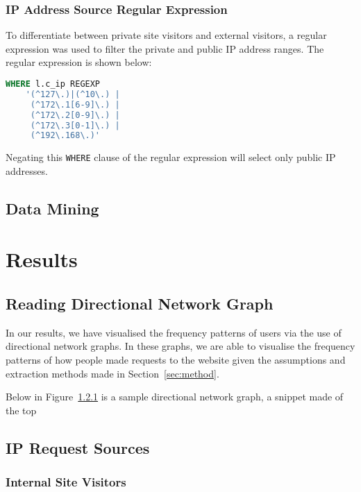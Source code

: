 \documentclass[12pt,titlepage]{article}
\begin{document}
\subsubsection{IP Address Source Regular Expression}

To differentiate between private site visitors and external visitors, a regular expression was used to filter the private and public IP address ranges. The regular expression is shown below:

\begin{lstlisting}[language=SQL, xleftmargin=2cm]
WHERE l.c_ip REGEXP 
	'(^127\.)|(^10\.) | 
	 (^172\.1[6-9]\.) |
	 (^172\.2[0-9]\.) |
	 (^172\.3[0-1]\.) |
	 (^192\.168\.)'
\end{lstlisting}

Negating this \texttt{WHERE} clause of the regular expression will select only public IP addresses.

\subsection{Data Mining}

\section{Results}
\label{sec:results}

\subsection{Reading Directional Network Graph}

In our results, we have visualised the frequency patterns of users via the use of directional network graphs. In these graphs, we are able to visualise the frequency patterns of how people made requests to the website given the assumptions and extraction methods made in Section~\ref{sec:method}.

Below in Figure~\ref{} is a sample directional network graph, a snippet made of the top 

\subsection{IP Request Sources}

\subsubsection{Internal Site Visitors}

\end{document}
